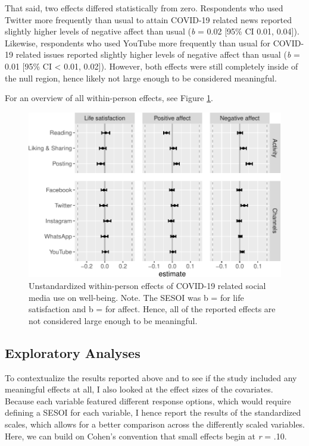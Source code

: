 \documentclass[
  man,mask,floatsintext]{apa7}
\begin{document}
That said, two effects differed statistically from zero.
Respondents who used Twitter more frequently than usual to attain COVID-19 related news reported slightly higher levels of negative affect than usual (\emph{b} = 0.02 {[}95\% CI 0.01, 0.04{]}).
Likewise, respondents who used YouTube more frequently than usual for COVID-19 related issues reported slightly higher levels of negative affect than usual (\emph{b} = 0.01 {[}95\% CI \textless{} 0.01, 0.02{]}).
However, both effects were still completely inside of the null region, hence likely not large enough to be considered meaningful.

For an overview of all within-person effects, see Figure \ref{fig:fig-within}.

\begin{figure}
\centering
\includegraphics{manuscript_files/figure-latex/fig-within-1.pdf}
\caption{\label{fig:fig-within}Unstandardized within-person effects of COVID-19 related social media use on well-being. Note. The SESOI was b = \textbar{} for life satisfaction and b = \textbar{} for affect. Hence, all of the reported effects are not considered large enough to be meaningful.}
\end{figure}

\hypertarget{exploratory-analyses}{%
\subsection{Exploratory Analyses}\label{exploratory-analyses}}

To contextualize the results reported above and to see if the study included any meaningful effects at all, I also looked at the effect sizes of the covariates.
Because each variable featured different response options, which would require defining a SESOI for each variable, I hence report the results of the standardized scales, which allows for a better comparison across the differently scaled variables.
Here, we can build on Cohen's convention that small effects begin at \emph{r} = \textbar.10\textbar.
\end{document}
